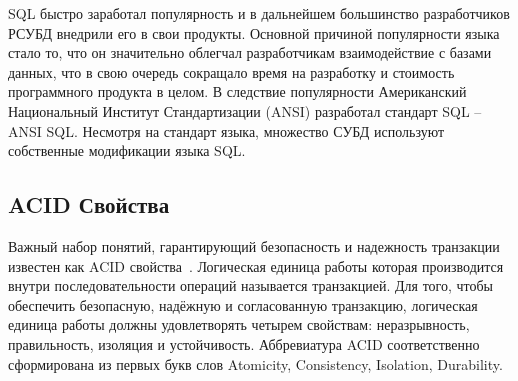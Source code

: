 SQL быстро заработал популярность и в дальнейшем большинство разработчиков РСУБД внедрили его в свои продукты. 
Основной причиной популярности языка стало то, что он значительно облегчал разработчикам взаимодействие с базами данных,
что в свою очередь сокращало время на разработку и стоимость программного продукта в целом.
В следствие популярности Американский Национальный Институт Стандартизации (ANSI) разработал стандарт SQL -- ANSI SQL.
Несмотря на стандарт языка, множество СУБД используют собственные модификации языка SQL.



\clearpage

\subsection{ACID Свойства}
Важный набор понятий, гарантирующий безопасность и надежность транзакции 
известен как ACID свойства~\cite{Date}.
Логическая единица работы которая производится внутри последовательности операций
называется транзакцией.
Для того, чтобы обеспечить безопасную, надёжную и согласованную транзакцию,
логическая единица работы должны удовлетворять четырем свойствам: 
неразрывность, правильность, изоляция и устойчивость. 
Аббревиатура ACID соответственно сформирована из первых букв слов 
Atomicity, Consistency, Isolation, Durability.

